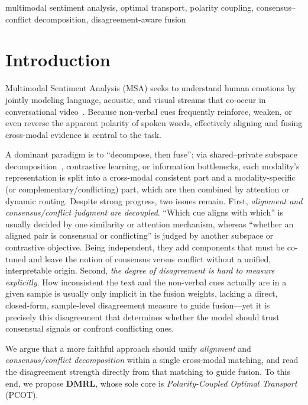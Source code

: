 \documentclass[conference]{IEEEtran}
\begin{document}
\begin{IEEEkeywords}
multimodal sentiment analysis, optimal transport, polarity coupling,
consensus--conflict decomposition, disagreement-aware fusion
\end{IEEEkeywords}

\section{Introduction}
Multimodal Sentiment Analysis (MSA) seeks to understand human emotions by jointly
modeling language, acoustic, and visual streams that co-occur in conversational
video~\cite{zadeh2018mosei,yu2020ch}. Because non-verbal cues frequently reinforce,
weaken, or even reverse the apparent polarity of spoken words, effectively aligning
and fusing cross-modal evidence is central to the task.

A dominant paradigm is to ``decompose, then fuse'': via shared--private subspace
decomposition~\cite{hazarika2020misa}, contrastive learning, or information
bottlenecks, each modality's representation is split into a cross-modal consistent
part and a modality-specific (or complementary/conflicting) part, which are then
combined by attention or dynamic routing. Despite strong progress, two issues
remain. First, \emph{alignment and consensus/conflict judgment are decoupled}.
``Which cue aligns with which'' is usually decided by one similarity or attention
mechanism, whereas ``whether an aligned pair is consensual or conflicting'' is
judged by another subspace or contrastive objective. Being independent, they add
components that must be co-tuned and leave the notion of consensus versus conflict
without a unified, interpretable origin. Second, \emph{the degree of disagreement
is hard to measure explicitly}. How inconsistent the text and the non-verbal cues
actually are in a given sample is usually only implicit in the fusion weights,
lacking a direct, closed-form, sample-level disagreement measure to guide
fusion---yet it is precisely this disagreement that determines whether the model
should trust consensual signals or confront conflicting ones.

We argue that a more faithful approach should unify \emph{alignment} and
\emph{consensus/conflict decomposition} within a single cross-modal matching, and
read the disagreement strength directly from that matching to guide fusion. To this
end, we propose \textbf{DMRL}, whose sole core is \emph{Polarity-Coupled Optimal
Transport} (PCOT).
\end{document}
